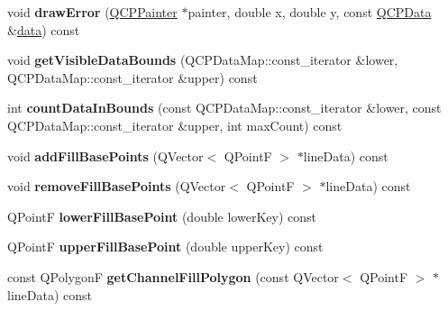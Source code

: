 \begin{DoxyCompactItemize}
\item 
\hypertarget{classQCPGraph_a4df6807066ce877705e999773e7ffbc4}{}void {\bfseries draw\+Error} (\hyperlink{classQCPPainter}{Q\+C\+P\+Painter} $\ast$painter, double x, double y, const \hyperlink{classQCPData}{Q\+C\+P\+Data} \&\hyperlink{classQCPGraph_a2f58436df4f86a2792b776a21642b3d9}{data}) const \label{classQCPGraph_a4df6807066ce877705e999773e7ffbc4}

\item 
\hypertarget{classQCPGraph_a6a317cb14a83dae0841c7041a63d6d9d}{}void {\bfseries get\+Visible\+Data\+Bounds} (Q\+C\+P\+Data\+Map\+::const\+\_\+iterator \&lower, Q\+C\+P\+Data\+Map\+::const\+\_\+iterator \&upper) const \label{classQCPGraph_a6a317cb14a83dae0841c7041a63d6d9d}

\item 
\hypertarget{classQCPGraph_a13f6a3aa60227e03ab1f7aa8eec6589f}{}int {\bfseries count\+Data\+In\+Bounds} (const Q\+C\+P\+Data\+Map\+::const\+\_\+iterator \&lower, const Q\+C\+P\+Data\+Map\+::const\+\_\+iterator \&upper, int max\+Count) const \label{classQCPGraph_a13f6a3aa60227e03ab1f7aa8eec6589f}

\item 
\hypertarget{classQCPGraph_a5fa7884620d7c54b81dfbd255d97b636}{}void {\bfseries add\+Fill\+Base\+Points} (Q\+Vector$<$ Q\+Point\+F $>$ $\ast$line\+Data) const \label{classQCPGraph_a5fa7884620d7c54b81dfbd255d97b636}

\item 
\hypertarget{classQCPGraph_ad31b49a90e91e538fd9caf011c913a68}{}void {\bfseries remove\+Fill\+Base\+Points} (Q\+Vector$<$ Q\+Point\+F $>$ $\ast$line\+Data) const \label{classQCPGraph_ad31b49a90e91e538fd9caf011c913a68}

\item 
\hypertarget{classQCPGraph_a41f982e8ceaefe6a53eb7432f26d64b6}{}Q\+Point\+F {\bfseries lower\+Fill\+Base\+Point} (double lower\+Key) const \label{classQCPGraph_a41f982e8ceaefe6a53eb7432f26d64b6}

\item 
\hypertarget{classQCPGraph_a363d066c179e0f46cc93c12bafb0bfba}{}Q\+Point\+F {\bfseries upper\+Fill\+Base\+Point} (double upper\+Key) const \label{classQCPGraph_a363d066c179e0f46cc93c12bafb0bfba}

\item 
\hypertarget{classQCPGraph_a0374b7268e35cab9802a6be2b5d726d7}{}const Q\+Polygon\+F {\bfseries get\+Channel\+Fill\+Polygon} (const Q\+Vector$<$ Q\+Point\+F $>$ $\ast$line\+Data) const \label{classQCPGraph_a0374b7268e35cab9802a6be2b5d726d7}


\end{DoxyCompactItemize}
